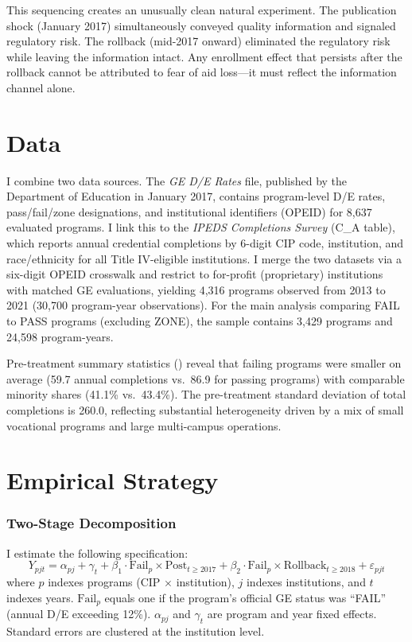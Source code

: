 \documentclass[12pt]{article}
\begin{document}
This sequencing creates an unusually clean natural experiment. The publication shock (January 2017) simultaneously conveyed quality information and signaled regulatory risk. The rollback (mid-2017 onward) eliminated the regulatory risk while leaving the information intact. Any enrollment effect that persists after the rollback cannot be attributed to fear of aid loss---it must reflect the information channel alone.

\section{Data}

I combine two data sources. The \textit{GE D/E Rates} file, published by the Department of Education in January 2017, contains program-level D/E rates, pass/fail/zone designations, and institutional identifiers (OPEID) for 8,637 evaluated programs. I link this to the \textit{IPEDS Completions Survey} (C\_A table), which reports annual credential completions by 6-digit CIP code, institution, and race/ethnicity for all Title IV-eligible institutions. I merge the two datasets via a six-digit OPEID crosswalk and restrict to for-profit (proprietary) institutions with matched GE evaluations, yielding 4,316 programs observed from 2013 to 2021 (30,700 program-year observations). For the main analysis comparing FAIL to PASS programs (excluding ZONE), the sample contains 3,429 programs and 24,598 program-years.



Pre-treatment summary statistics () reveal that failing programs were smaller on average (59.7 annual completions vs.\ 86.9 for passing programs) with comparable minority shares (41.1\% vs.\ 43.4\%). The pre-treatment standard deviation of total completions is 260.0, reflecting substantial heterogeneity driven by a mix of small vocational programs and large multi-campus operations.

\section{Empirical Strategy}

\subsubsection*{Two-Stage Decomposition} I estimate the following specification:
\begin{equation}
Y_{pjt} = \alpha_{pj} + \gamma_t + \beta_1 \cdot \text{Fail}_p \times \text{Post}_{t \geq 2017} + \beta_2 \cdot \text{Fail}_p \times \text{Rollback}_{t \geq 2018} + \varepsilon_{pjt}
\label{eq:main}
\end{equation}
where $p$ indexes programs (CIP $\times$ institution), $j$ indexes institutions, and $t$ indexes years. $\text{Fail}_p$ equals one if the program's official GE status was ``FAIL'' (annual D/E exceeding 12\%). $\alpha_{pj}$ and $\gamma_t$ are program and year fixed effects. Standard errors are clustered at the institution level.
\end{document}
